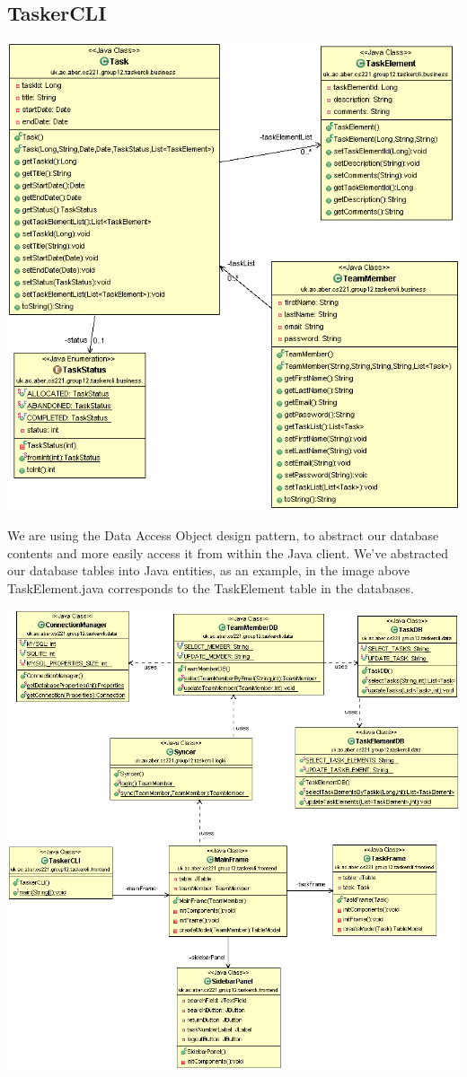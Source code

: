 \subsection{TaskerCLI}
  
  
  \includegraphics{image1.gif}

  We are using the Data Access Object design pattern, to abstract our database contents and more easily access it from within the Java client.
  We've abstracted our database tables into Java entities, as an example, in the image above TaskElement.java corresponds to the TaskElement table in the databases.
  
  
  
  \includegraphics{image2.gif}
  
